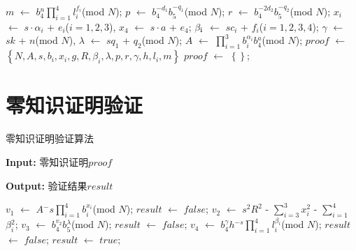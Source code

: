 \documentclass{article}
\begin{document}
\begin{algorithm}
\begin{algorithmic}[1]
			\STATE ${m}$ $\gets$ ${b{_4^n}}$$\prod_{i=1}^{4}$${l{_i^{f{_i}}}}$(mod ${N}$);
			\STATE ${p}$ $\gets$ ${b{_4^{-d_1}}}$${b{_5^{-q_1}}}$(mod ${N}$);
			\STATE ${r}$ $\gets$ ${b{_4^{-2d_2}}}$${b{_5^{-q_2}}}$(mod ${N}$);
			\STATE ${x_i}$ $\gets$ ${s·\alpha_i}$ + ${e{_i}}$(${i}=1, 2, 3$), ${x_4}$ $\gets$ ${s·a}$ + ${e{_4}}$;
			\STATE $\beta$$_{\mbox{\scriptsize i}}$ $\gets$ ${sc_i}$ + ${f{_i}}$(${i}=1, 2, 3, 4$);
			\STATE $\gamma$ $\gets$ ${sk}$ + ${n}$(mod ${N}$), $\lambda$ $\gets$ ${sq_1}$ + ${q_2}$(mod ${N}$);
			\STATE ${A}$ $\gets$ $\prod_{i=1}^{3}$${b{_i^{\alpha{_i}}}b{_4^a}}$(mod ${N}$);
			\STATE ${proof}$ $\gets$ $\left\{N, A, s, b_i, x_i, g, R, \beta_i, \lambda, p, r, \gamma, h, l_i, m\right\}$
			\ELSE
			\STATE ${proof}$ $\gets$ $\left\{\right\}$;
			\ENDIF
		\end{algorithmic}
	\end{algorithm}
	
	
	\section{零知识证明验证}
	\begin{algorithm}
		\caption{零知识证明验证算法} %
		\label{alg2} %
		{\bf Input:} 零知识证明${proof}$
		
		{\bf Output:} 验证结果${result}$
		\begin{algorithmic}[1]
			\STATE ${v_1}$ $\gets$ ${A{^-s}}$$\prod_{i=1}^{4}$${b{_i^{x{_i}}}}$(mod ${N}$);
			\STATE ${result}$ $\gets$ ${false}$;
			\ENDIF
			\STATE ${v_2}$ $\gets$ ${s^2R^2}$ - $\sum_{i=3}^{3}$${x{_i^2}}$ - $\sum_{i=1}^{4}$${\beta{_i^2}}$; ${v_3}$ $\gets$ ${b{_4^{v_2}}b{_5^{\lambda}}}$(mod ${N}$);
			\STATE ${result}$ $\gets$ ${false}$;
			\ENDIF
			\STATE ${v_4}$ $\gets$ ${b{_4^\gamma}h{^{-s}}}$$\prod_{i=1}^{4}$${l{_i^{\beta{_i}}}}$(mod ${N}$);
			\STATE ${result}$ $\gets$ ${false}$;
			\ENDIF
			\STATE ${result}$ $\gets$ ${true}$;
		\end{algorithmic}
	\end{algorithm}
	
\end{document}
